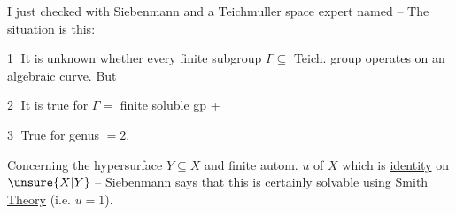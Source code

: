 
I just checked with Siebenmann and a Teichmuller space expert named  -- The situation is this:

\textcircled{1} It is unknown whether every finite subgroup $\Gamma\subseteq$ Teich. group operates on an algebraic curve. But

\textcircled{2} It is true for $\Gamma=$ finite soluble gp +

\textcircled{3} True  for genus $=2$.


Concerning the hypersurface $Y\subseteq X$ and finite autom. $u$ of $X$ which is \uline{identity} on $\unsure{X|Y}$ -- Siebenmann says that this is certainly solvable using \uline{Smith Theory} (i.e. $u=1$).
